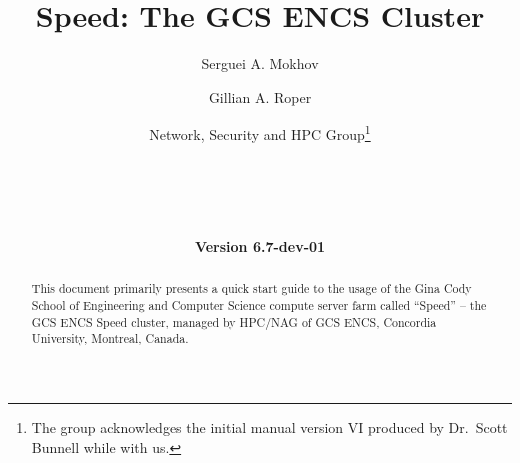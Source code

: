 \documentclass{easychair}
\begin{document}
%
\title{Speed: The GCS ENCS Cluster}

%

\date{\textbf{Version 6.7-dev-01}}

%
\author{
    Serguei A. Mokhov
\and
    Gillian A. Roper
\and
    Network, Security and HPC Group\footnote{The group acknowledges the initial manual version VI produced by Dr.~Scott Bunnell while with us.}\\
    \\
    \\
    \\
    \\
}

%

\maketitle

\begin{abstract}
This document primarily presents a quick start
guide to the usage of the Gina Cody School of
Engineering and Computer Science compute server farm
called ``Speed'' -- the GCS ENCS Speed cluster,
managed by HPC/NAG of GCS ENCS, Concordia University,
Montreal, Canada.
\end{abstract}

\tableofcontents
\clearpage
\end{document}

